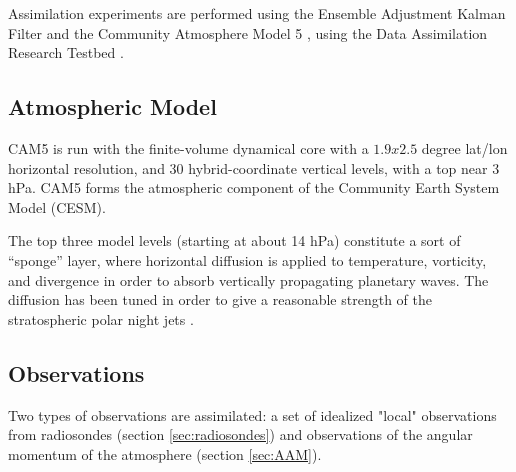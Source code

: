 Assimilation experiments are performed using the Ensemble Adjustment Kalman Filter \citep[EAKF]{anderson2001} and the Community Atmosphere Model 5 \citep[CAM5]{nealeetal2010}, using the Data Assimilation Research Testbed \citep[DART]{Anderson2009, Raeder2012}.


\subsection{Atmospheric Model}
\label{sec:CAM}
CAM5 is run with the finite-volume dynamical core with a $1.9x2.5$ degree lat/lon horizontal resolution, and  30 hybrid-coordinate vertical levels, with a top near 3 hPa.
CAM5 forms the atmospheric component of the Community Earth System Model (CESM).

The top three model levels (starting at about 14 hPa) constitute a sort of ``sponge'' layer, where horizontal diffusion is applied to temperature, vorticity, and divergence in order to absorb vertically propagating planetary waves.  
The diffusion has been tuned in order to give a reasonable strength of the stratospheric polar night jets \citep{nealeetal2010}.




\subsection{Observations}

Two types of observations are assimilated: a set of idealized "local" observations from radiosondes (section \ref{sec:radiosondes}) and observations of the angular momentum of the atmosphere (section \ref{sec:AAM}).  

